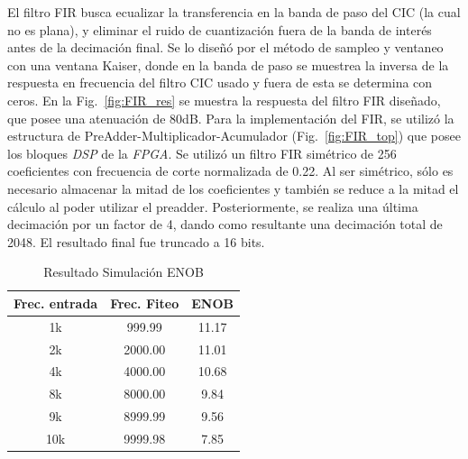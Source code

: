 \documentclass[a4paper,conference]{IEEEtran}
\begin{document}
El filtro FIR busca ecualizar la transferencia en la banda de paso del CIC (la cual no es plana), y eliminar el ruido de cuantizaci\'on fuera de la banda de interés antes de la 
decimaci\'on final. Se lo dise\~n\'o por el m\'etodo de sampleo y ventaneo con una ventana Kaiser, donde en la banda de paso se muestrea la inversa de la respuesta en frecuencia del filtro CIC usado y fuera de esta se determina con ceros\cite{FIR_Comp}. En la Fig.~\ref{fig:FIR_res} se muestra la respuesta del filtro FIR diseñado, que posee una atenuaci\'on de 80dB.
Para la implementación del FIR, se utiliz\'o la estructura de PreAdder-Multiplicador-Acumulador (Fig.~\ref{fig:FIR_top}) que posee los bloques \textit{DSP} de la \textit{FPGA}\cite{Sp6-DSP}. Se utiliz\'o un filtro FIR sim\'etrico de 256 coeficientes  con frecuencia de corte normalizada de 0.22. Al ser sim\'etrico, s\'olo es necesario almacenar la mitad de los coeficientes y tambi\'en se reduce a la mitad el c\'alculo al poder utilizar el preadder.  Posteriormente, se realiza una \'ultima decimaci\'on por un factor de 4, dando como resultante una decimaci\'on total de 2048. El resultado final fue truncado a 16 bits.


\begin{table}[!b]
	\renewcommand{\arraystretch}{1.3}
	\caption{Resultado Simulaci\'on ENOB}
	\label{Tabla:sim}
	\centering
	\begin{tabular}{|c|c|c|}
		\hline
		Frec. entrada & Frec. Fiteo & ENOB\\
		\hline
		1k & 999.99 & 11.17\\
		\hline
		2k & 2000.00 & 11.01\\
		\hline
		4k & 4000.00 & 10.68\\
		\hline
		8k & 8000.00 & 9.84\\
		\hline
		9k & 8999.99 & 9.56\\
		\hline
		10k & 9999.98 & 7.85\\
		\hline
	\end{tabular}
\end{table}
\end{document}

